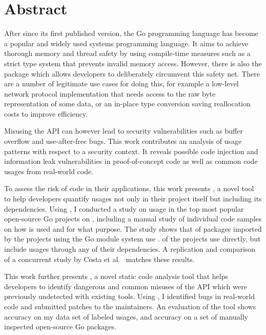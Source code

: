 \chapter*{Abstract}

After  since its first published version, the Go programming language has become a popular and
widely used systems programming language.
It aims to achieve thorough memory and thread safety by using compile-time measures such as a strict type system that
prevents invalid memory access.
However, there is also the \unsafe{} package which allows developers to deliberately circumvent this safety net.
There are a number of legitimate use cases for doing this, for example a low-level network protocol implementation that
needs access to the raw byte representation of some data, or an in-place type conversion saving reallocation costs to
improve efficiency.

Misusing the \unsafe{} API can however lead to security vulnerabilities such as buffer overflow and use-after-free bugs.
This work contributes an analysis of \unsafe{} usage patterns with respect to a security context.
It reveals possible code injection and information leak vulnerabilities in proof-of-concept code as well as common code
usages from real-world code.

To assess the risk of \unsafe{} code in their applications, this work presents \toolGeiger{}, a novel tool to help
developers quantify \unsafe{} usages not only in their project itself but including its dependencies.
Using \toolGeiger{}, I conducted a study on \unsafe{} usage in the top \projsTotal{} most popular open-source Go
projects on \github{}, including a manual study of \numberLabeledCodeSnippets{} individual code samples on how \unsafe{}
is used and for what purpose.
The study shows that \percentageUnsafePackages{} of packages imported by the projects using the Go module system use
\unsafe{}.
\percentageUnsafeProjects{} of the projects use \unsafe{} directly, but \percentageUnsafeTransitiveWithDependencies{}
include \unsafe{} usages through any of their dependencies.
A replication and comparison of a concurrent study by Costa et al.~\cite{costa2020} matches these results.

This work further presents \toolSafer{}, a novel static code analysis tool that helps developers to identify
 dangerous and common misuses of the \unsafe{} API which were previously undetected with existing tools.
Using \toolSafer{}, I identified \numberBugsFixed{} bugs in real-world code and submitted patches to the maintainers.
An evaluation of the tool shows \goSaferEvaluationDatasetGosaferAccuracy{} accuracy on my data set of labeled \unsafe{}
usages, and \goSaferEvaluationPackagesGosaferAccuracy{} accuracy on a set of manually inspected open-source Go packages.



